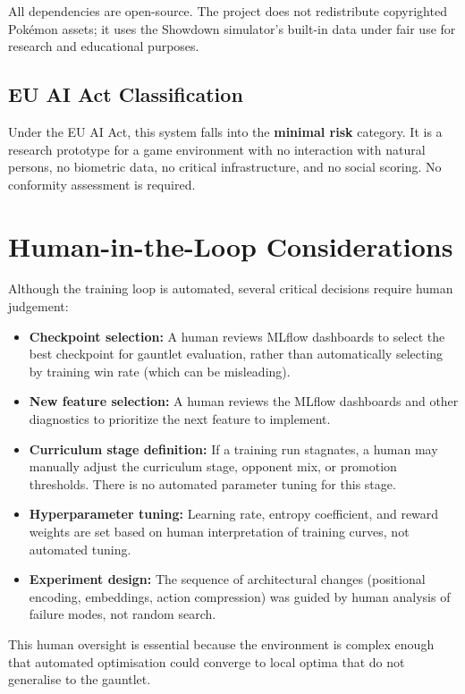 All dependencies are open-source.  The project does not redistribute
copyrighted Pok\'{e}mon assets; it uses the Showdown simulator's built-in data
under fair use for research and educational purposes.

\subsection{EU AI Act Classification}

Under the EU AI Act, this system falls into the \textbf{minimal risk}
category.  It is a research prototype for a game environment with no
interaction with natural persons, no biometric data, no critical
infrastructure, and no social scoring.  No conformity assessment is required.

\section{Human-in-the-Loop Considerations}

Although the training loop is automated, several critical decisions require
human judgement:

\begin{itemize}
  \item \textbf{Checkpoint selection:} A human reviews MLflow dashboards to
        select the best checkpoint for gauntlet evaluation, rather than
        automatically selecting by training win rate (which can be misleading).
\item \textbf{New feature selection:} A human reviews the MLflow dashboards and other diagnostics to prioritize the next feature to implement.
  \item \textbf{Curriculum stage definition:} If a training run stagnates, a
        human may manually adjust the curriculum stage, opponent mix, or
        promotion thresholds. There is no automated parameter tuning for this stage.
  \item \textbf{Hyperparameter tuning:} Learning rate, entropy coefficient,
        and reward weights are set based on human interpretation of training
        curves, not automated tuning.
  \item \textbf{Experiment design:} The sequence of architectural changes
        (positional encoding, embeddings, action compression) was guided by
        human analysis of failure modes, not random search.
\end{itemize}

This human oversight is essential because the environment is complex enough
that automated optimisation could converge to local optima that do not
generalise to the gauntlet.

